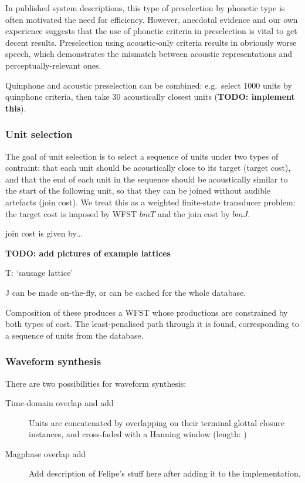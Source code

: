 In published system descriptions, this type of preselection by phonetic type is often motivated the need for efficiency. However, anecdotal evidence and our own experience suggests that the use of phonetic criteria in preselection is vital to get decent results. Preselection using acoustic-only criteria results in obviously worse speech, which demonstrates the mismatch between acoustic representations and perceptually-relevant ones. 

Quinphone and acoustic preselection can be combined: e.g.\ select 1000 units by quinphone criteria, then take 30 acoustically closest units (\textbf{TODO: implement this}).

\subsubsection{Unit selection}
The goal of unit selection is to select a sequence of units under two types of contraint: that each unit should be acoustically close to its target (target cost), and that the end of each unit in the sequence should be acoustically similar to the start of the following unit, so that they can be joined without audible artefacts (join cost).
We treat this as a weighted finite-state transducer problem: the target cost is imposed by WFST $bm{T}$ and the join cost by $bm{J}$.

join cost is given by...

\textbf{TODO: add pictures of example lattices}

T: `sausage lattice'

J can be made on-the-fly, or can be cached for the whole database.

 Composition of these produces a WFST whose productions are constrained by both types of cost. The least-penalised path through it is found, corresponding to a sequence of units from the database.


\subsubsection{Waveform synthesis}

There are two possibilities for waveform synthesis:

\begin{description}
    \item[Time-domain overlap and add] Units are concatenated by overlapping on their terminal glottal closure instances, and cross-faded with a Hanning window (length: )
    \item[Magphase overlap add] Add description of Felipe's stuff here after adding it to the implementation.
\end{description}



